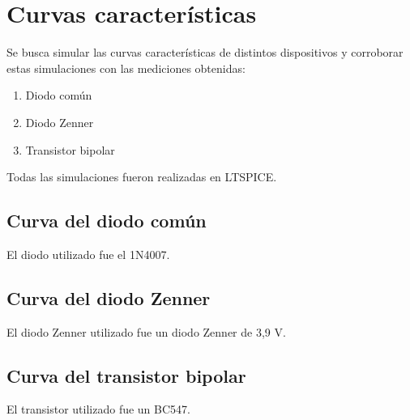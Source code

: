 \documentclass[../../e1_tp1_main.tex]{subfiles}
\begin{document}
\chapter{Curvas características}
Se busca simular las curvas características de distintos dispositivos y corroborar estas simulaciones con las mediciones obtenidas:

\begin{enumerate}
	\item Diodo común
	\item Diodo Zenner
	\item Transistor bipolar
\end{enumerate}

Todas las simulaciones fueron realizadas en LTSPICE. 

\section{Curva del diodo común}
	El diodo utilizado fue el 1N4007.

\section{Curva del diodo Zenner}
	El diodo Zenner utilizado fue un diodo Zenner de 3,9 V.
	
\section{Curva del transistor bipolar}
 El transistor utilizado fue un BC547.
\end{document}
